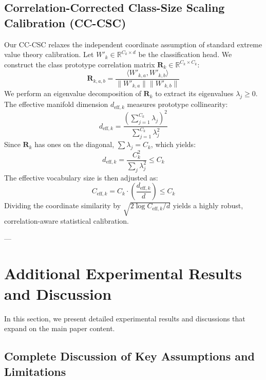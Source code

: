 \subsection{Correlation-Corrected Class-Size Scaling Calibration (CC-CSC)}
\label{sec:app_cccsc_formulation}

Our CC-CSC relaxes the independent coordinate assumption of standard extreme value theory calibration. Let $W'_k \in \mathbb{R}^{C_k \times d}$ be the classification head. We construct the class prototype correlation matrix $\mathbf{R}_k \in \mathbb{R}^{C_k \times C_k}$:
\begin{equation}
\mathbf{R}_{k, a, b} = \frac{\langle W'_{k, a}, W'_{k, b} \rangle}{\|W'_{k, a}\| \|W'_{k, b}\|}
\end{equation}
We perform an eigenvalue decomposition of $\mathbf{R}_k$ to extract its eigenvalues $\lambda_j \ge 0$. The effective manifold dimension $d_{\text{eff}, k}$ measures prototype collinearity:
\begin{equation}
d_{\text{eff}, k} = \frac{\left( \sum_{j=1}^{C_k} \lambda_j \right)^2}{\sum_{j=1}^{C_k} \lambda_j^2}
\end{equation}
Since $\mathbf{R}_k$ has ones on the diagonal, $\sum \lambda_j = C_k$, which yields:
\begin{equation}
d_{\text{eff}, k} = \frac{C_k^2}{\sum_j \lambda_j^2} \le C_k
\end{equation}
The effective vocabulary size is then adjusted as:
\begin{equation}
C_{\text{eff}, k} = C_k \cdot \left( \frac{d_{\text{eff}, k}}{d} \right) \le C_k
\end{equation}
Dividing the coordinate similarity by $\sqrt{2 \log C_{\text{eff}, k} / d}$ yields a highly robust, correlation-aware statistical calibration.

---

\section{Additional Experimental Results and Discussion}
\label{sec:app_experiments}

In this section, we present detailed experimental results and discussions that expand on the main paper content.

\subsection{Complete Discussion of Key Assumptions and Limitations}
\label{sec:app_limitations}

